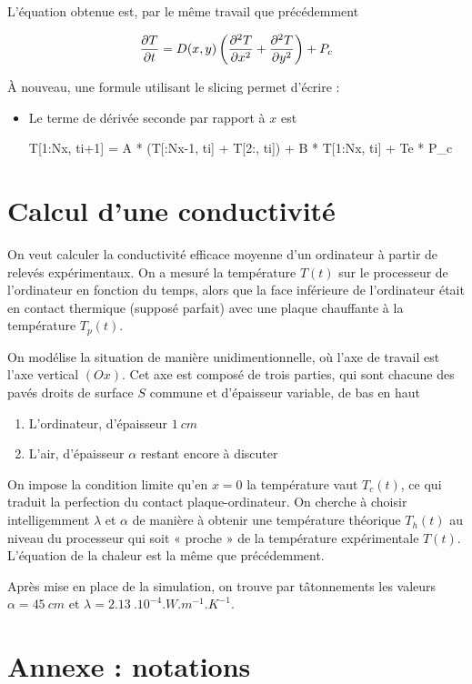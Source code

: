 \documentclass{article}
\begin{document}
L'équation obtenue est, par le même travail que précédemment

$$\pdv{T}{t} = D(x, y) \left( \pdv[2]{T}{x} + \pdv[2]{T}{y} \right)+ P_c$$

À nouveau, une formule utilisant le slicing permet d'écrire :
\begin{itemize}
    \item Le terme de dérivée seconde par rapport à $x$ est
    \begin{python}
    T[1:Nx, ti+1] = A * (T[:Nx-1, ti] + T[2:, ti]) + B * T[1:Nx, ti] + Te * P_c
    \end{python}
\end{itemize}


\section{Calcul d'une conductivité}

On veut calculer la conductivité efficace moyenne d'un ordinateur à partir de relevés expérimentaux. On a mesuré la température $T(t)$ sur le processeur de l'ordinateur en fonction du temps, alors que la face inférieure de l'ordinateur était en contact thermique (supposé parfait) avec une plaque chauffante à la température $T_p(t)$.

On modélise la situation de manière unidimentionnelle, où l'axe de travail est l'axe vertical $(Ox)$. Cet axe est composé de trois parties, qui sont chacune des pavés droits de surface $S$ commune et d'épaisseur variable, de bas en haut
\begin{enumerate}
    \item L'ordinateur, d'épaisseur $\SI{1}{cm}$
    \item L'air, d'épaisseur $\alpha$ restant encore à discuter
\end{enumerate}

On impose la condition limite qu'en $x = 0$ la température vaut $T_c(t)$, ce qui traduit la perfection du contact plaque-ordinateur. On cherche à choisir intelligemment $\lambda$ et $\alpha$ de manière à obtenir une température théorique $T_h(t)$ au niveau du processeur qui soit « proche » de la température expérimentale $T(t)$. L'équation de la chaleur est la même que précédemment.

Après mise en place de la simulation, on trouve par tâtonnements les valeurs $\alpha = \SI{45}{cm}$ et $\lambda = \SI{2,13}{.10^{-4}.W.m^{-1}.K^{-1}}$.

\section*{Annexe : notations}
\end{document}
